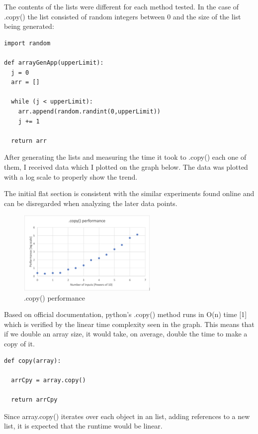 \documentclass[12pt]{article}
\begin{document}
The contents of the lists were different for each method tested. In the case of .copy() the list consisted of random integers between 0 and the size of the list being generated:

\footnotesize
\begin{verbatim}
import random

def arrayGenApp(upperLimit):
  j = 0
  arr = []

  while (j < upperLimit):
    arr.append(random.randint(0,upperLimit))
    j += 1

  return arr
\end{verbatim}
\normalsize

After generating the lists and measuring the time it took to .copy() each one of them, I received data which I plotted on the graph below. The data was plotted with a log scale to properly show the trend.

The initial flat section is consistent with the similar experiments found online and can be disregarded when analyzing the later data points. 

\begin{figure}[H]
\centering
\includegraphics[width=0.6\textwidth,height=\textheight,keepaspectratio]{copygraph.png}
\caption{.copy() performance}
\label{Figure: copygraph}
\end{figure}

Based on official documentation, python's .copy() method runs in O(n) time [1] which is verified by the linear time complexity seen in the graph. This means that if we double an array size, it would take, on average, double the time to make a copy of it. 

\footnotesize
\begin{verbatim}
def copy(array):

  arrCpy = array.copy()

  return arrCpy
\end{verbatim}
\normalsize

Since array.copy() iterates over each object in an list, adding references to a new list, it is expected that the runtime would be linear.
\end{document}
